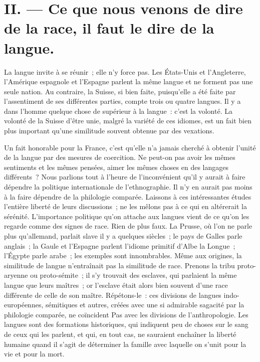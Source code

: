 \documentclass[french,twoside]{book} %
\newcommand\orgName[1]{#1}
\begin{document}
\section[{II. — Ce que nous venons de dire de la race, il faut le dire de la langue.}]{II. — Ce que nous venons de dire de la race, il faut le dire de la langue.}
\noindent La langue invite à se réunir ; elle n’y force pas. Les {\orgName États-Unis} et l’{\orgName Angleterre}, l’{\orgName Amérique espagnole} et l’{\orgName Espagne} parlent la même langue et ne forment pas une seule nation. Au contraire, la {\orgName Suisse}, si bien faite, puisqu’elle a été faite par l’assentiment de ses différentes parties, compte trois ou quatre langues. Il y a dans l’homme quelque chose de supérieur à la langue : c’est la volonté. La volonté de la {\orgName Suisse} d’être unie, malgré la variété de ces idiomes, est un fait bien plus important qu’une similitude souvent obtenue par des vexations.\par
Un fait honorable pour la {\orgName France}, c’est qu’elle n’a jamais cherché à obtenir l’unité de la langue par des mesures de coercition. Ne peut-on pas avoir les mêmes sentiments et les mêmes pensées, aimer les mêmes choses en des langages différents ? Nous parlions tout à l’heure de l’inconvénient qu’il y aurait à faire dépendre la politique internationale de l’ethnographie. Il n’y en aurait pas moins à la faire dépendre de la philologie comparée. Laissons à ces intéressantes études l’entière liberté de leurs discussions ; ne les mêlons pas à ce qui en altérerait la sérénité. L’importance politique qu’on attache aux langues vient de ce qu’on les regarde comme des signes de race. Rien de plus faux. La {\orgName Prusse}, où l’on ne parle plus qu’allemand, parlait slave il y a quelques siècles ; le {\orgName pays de Galles} parle anglais ; la {\orgName Gaule} et l’{\orgName Espagne} parlent l’idiome primitif d’{\orgName Albe la Longue} ; l’{\orgName Égypte} parle arabe ; les exemples sont innombrables. Même aux origines, la similitude de langue n’entraînait pas la similitude de race. Prenons la {\orgName tribu proto-aryenne} ou proto-sémite ; il s’y trouvait des esclaves, qui parlaient la même langue que leurs maîtres ; or l’esclave était alors bien souvent d’une race différente de celle de son maître. Répétons-le : ces divisions de langues indo-européennes, sémitiques et autres, créées avec une si admirable sagacité par la philologie comparée, ne coïncident Pas avec les divisions de l’anthropologie. Les langues sont des formations historiques, qui indiquent peu de choses sur le sang de ceux qui les parlent, et qui, en tout cas, ne sauraient enchaîner la liberté humaine quand il s’agit de déterminer la famille avec laquelle on s’unit pour la vie et pour la mort.\par
\end{document}
